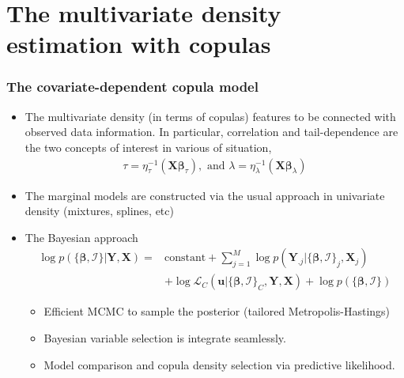 \documentclass{beamer}
\begin{document}
\section{The multivariate density estimation with copulas}
\begin{frame}
  \frametitle{The covariate-dependent copula model}
  \begin{itemize}
  \item The multivariate density (in terms of copulas) features to be connected with observed data information. In particular, correlation and tail-dependence are the two concepts of interest in various of situation,
\begin{equation*}
  \begin{split}
 \tau=\eta_{\tau}^{-1}(\bm{X}\bm{\beta}_{\tau}),\text{ and } \lambda=\eta_{\lambda}^{-1}(\bm{X}\bm{\beta}_{\lambda})
  \end{split}
\end{equation*}

\item The marginal models are constructed via the usual approach in univariate
  density (mixtures, splines, etc)

\item The Bayesian approach
  \begin{equation*}
    \begin{split}\log p(\{\bm{\beta},\bm{\mathcal{I}}\}|\bm{Y},\bm{X})= & \mathrm{constant}+\sum\nolimits _{j=1}^{M}\log p(\bm{Y}_{.j}|\{\bm{\beta},\bm{\mathcal{I}}\}_{j},\bm{X}_{j})\\
 & +\log\mathcal{L}_{C}(\bm{u}|\{\bm{\beta},\bm{\mathcal{I}}\}_{C},\bm{Y},\bm{X})+\log p(\{\bm{\beta},\bm{\mathcal{I}}\})
\end{split}
  \end{equation*}
  \begin{itemize}
  \item Efficient MCMC to sample the posterior (tailored Metropolis-Hastings)
  \item Bayesian variable selection is integrate seamlessly.
  \item Model comparison and copula density selection via predictive
    likelihood.
  \end{itemize}
\end{itemize}
\end{frame}

\end{document}
